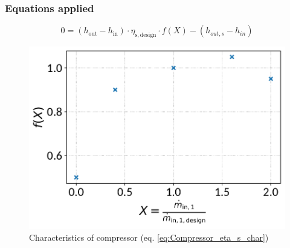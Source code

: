 \documentclass[]{article}
\begin{document}
\subsubsection{Equations applied}

\begin{equation}
\label{eq:Compressor_eta_s_char}
0=\left(h_\mathrm{out}-h_\mathrm{in}\right)\cdot\eta_\mathrm{s,design}\cdot f\left(X\right)-\left( h_{out,s} - h_{in} \right)
\end{equation}

\begin{minipage}{0.5\textwidth}
\begin{figure}[H]\begin{center}
\includegraphics[width=\textwidth]{figures/Compressor_CharLine_eta_s_char_compressor.pdf}
\caption{Characteristics of compressor (eq. \ref{eq:Compressor_eta_s_char})}
\label{fig:CharLine_eta_s_char_compressor}
\end{center}\end{figure}

\end{minipage}
\end{document}
